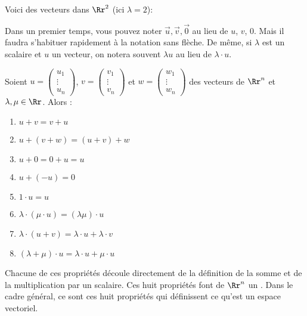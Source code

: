\documentclass[class=report,crop=false]{standalone}
\begin{document}
\bigskip

Voici des vecteurs dans $\Rr^2$ (ici $\lambda=2$):


Dans un premier temps, vous pouvez noter $\vec{u}, \vec{v}, \vec{0}$ au lieu de $u$, $v$, $0$.
Mais il faudra s'habituer rapidement à la notation sans flèche. De même, si
$\lambda$ est un scalaire et $u$ un vecteur, on notera souvent $\lambda u$
au lieu de $\lambda\cdot u$.


\begin{theoreme}
  Soient $u = \left(\begin{smallmatrix} u_1\\ \vdots \\ u_n \end{smallmatrix}\right)$, $v = \left(\begin{smallmatrix} v_1\\ \vdots \\ v_n \end{smallmatrix}\right)$
  et $w = \left(\begin{smallmatrix} w_1\\ \vdots \\ w_n \end{smallmatrix}\right)$ des vecteurs de $\Rr^n$
  et $\lambda, \mu \in \Rr$. Alors :
 \begin{enumerate}
 \item $u + v = v + u$
 \item $u + (v+w) = (u+v) +w$
 \item $u + 0 = 0 + u = u$
 \item $u + (-u) = 0$
 \item $1 \cdot u = u$
 \item $\lambda \cdot (\mu \cdot u) = (\lambda\mu )\cdot u$
 \item $\lambda \cdot (u+v) = \lambda \cdot u + \lambda \cdot v$
 \item $(\lambda + \mu ) \cdot u = \lambda \cdot u + \mu \cdot u$
 \end{enumerate}
\end{theoreme}



Chacune de ces propriétés découle directement de la définition de la somme
et de la multiplication par un scalaire. Ces huit propriétés font de $\Rr^n$ un
. Dans le cadre général, ce sont ces huit propriétés qui définissent
ce qu'est un espace vectoriel.
\end{document}
